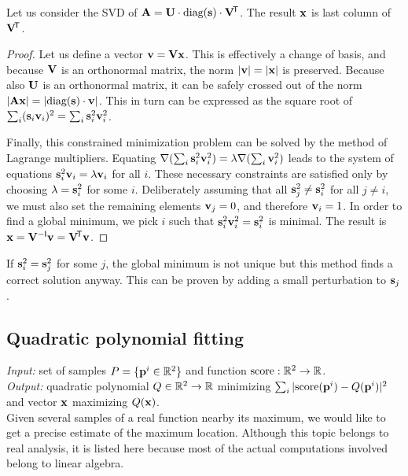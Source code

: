 Let us consider the SVD of $\mathbf{A} = \mathbf{U} \cdot \textrm{diag}(\mathbf{s}) \cdot \mathbf{V}^{\!\mathsf{T}}$.
The result $\mathbf{x}$ is last column of $\mathbf{V} ^{\!\mathsf{T}}$.

\begin{proof}
Let us define a vector $\mathbf{v} = \mathbf{V} \mathbf{x}$.
This is effectively a change of basis, and because $\mathbf{V}$ is an orthonormal matrix, the norm $|\mathbf{v}| = |\mathbf{x}|$ is preserved.
Because also $\mathbf{U}$ is an orthonormal matrix, it can be safely crossed out of the norm $|\mathbf{A} \mathbf{x}| = |\textrm{diag}(\mathbf{s}) \cdot \mathbf{v}|$.
This in turn can be expressed as the square root of $\sum_i (\mathbf{s}_i \mathbf{v}_i)^2 = \sum_i \mathbf{s}_i^2 \mathbf{v}_i^2$.

Finally, this constrained minimization problem can be solved by the method of Lagrange multipliers.
Equating $\nabla(\sum_i \mathbf{s}_i^2 \mathbf{v}_i^2) = \lambda \nabla (\sum_i \mathbf{v}_i^2)$ leads to the system of equations $\mathbf{s}_i^2 \mathbf{v}_i = \lambda \mathbf{v}_i$ for all $i$.
These necessary constraints are satisfied only by choosing $\lambda = \mathbf{s}_i^2$ for some $i$.
Deliberately assuming that all $\mathbf{s}_j^2 \neq \mathbf{s}_i^2$ for all $j \neq i$, we must also set the remaining elements $\mathbf{v}_j = 0$, and therefore $\mathbf{v}_i = 1$.
In order to find a global minimum, we pick $i$ such that $\mathbf{s}_i^2 \mathbf{v}_i^2 = \mathbf{s}_i^2$ is minimal.
The result is $\mathbf{x} = \mathbf{V} ^{-\mathsf{I}} \mathbf{v} = \mathbf{V} ^{\!\mathsf{T}} \mathbf{v}$.
\end{proof}

If $\mathbf{s}_i^2 = \mathbf{s}_j^2$ for some $j$, the global minimum is not unique but this method finds a correct solution anyway.
This can be proven by adding a small perturbation to $\mathbf{s}_j$.

\subsection{Quadratic polynomial fitting}
\textit{Input:} set of samples $P = \{\mathbf{p}^i \in \mathbb{R}^2 \}$ and function $\textrm{score}: \mathbb{R}^2 \to \mathbb{R}$.\\
\textit{Output:} quadratic polynomial $Q \in \mathbb{R}^2 \to \mathbb{R}$ minimizing $\sum_i |\textrm{score}(\mathbf{p}^i) - Q(\mathbf{p}^i)|^2$ and vector $\mathbf{x}$ maximizing $Q(\mathbf{x})$.\\

Given several samples of a real function nearby its maximum, we would like to get a precise estimate of the maximum location.
Although this topic belongs to real analysis, it is listed here because most of the actual computations involved belong to linear algebra.

